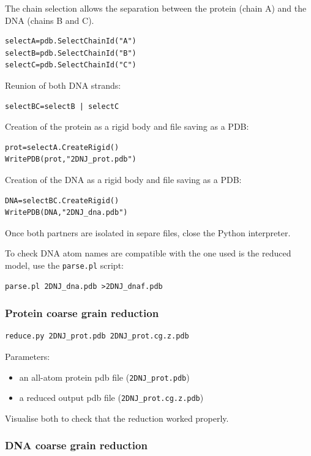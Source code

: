 \documentclass[12pt,a4paper]{article}
\begin{document}
The chain selection allows the separation between the protein (chain A) and the DNA (chains B and C).
\begin{verbatim}
selectA=pdb.SelectChainId("A")
selectB=pdb.SelectChainId("B")
selectC=pdb.SelectChainId("C")
\end{verbatim}

Reunion of both DNA strands:
\begin{verbatim}
selectBC=selectB | selectC
\end{verbatim}

Creation of the protein as a rigid body and file saving as a PDB:
\begin{verbatim}
prot=selectA.CreateRigid()
WritePDB(prot,"2DNJ_prot.pdb")
\end{verbatim}

Creation of the DNA as a rigid body and file saving as a PDB:
\begin{verbatim}
DNA=selectBC.CreateRigid()
WritePDB(DNA,"2DNJ_dna.pdb")
\end{verbatim}

Once both partners are isolated in separe files, close the Python interpreter.

To check DNA atom names are compatible with the one used is the reduced model, use the {\tt parse.pl} script:
\begin{verbatim}
parse.pl 2DNJ_dna.pdb >2DNJ_dnaf.pdb
\end{verbatim}

\subsubsection{Protein coarse grain reduction}

\begin{verbatim}
reduce.py 2DNJ_prot.pdb 2DNJ_prot.cg.z.pdb
\end{verbatim}

Parameters:
\begin{itemize}
\item an all-atom protein pdb file ({\tt 2DNJ\_prot.pdb})
\item a reduced output pdb file ({\tt 2DNJ\_prot.cg.z.pdb})
\end{itemize}

Visualise both to check that the reduction worked properly.

\subsubsection{DNA coarse grain reduction}
\end{document}
